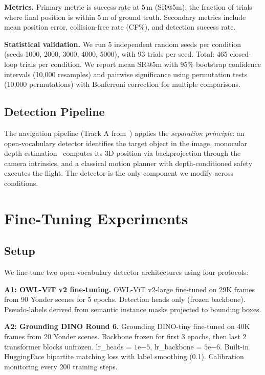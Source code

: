\documentclass[conference]{IEEEtran}
\begin{document}
\textbf{Metrics.} Primary metric is success rate at 5\,m (SR@5m): the fraction of trials where final position is within 5\,m of ground truth. Secondary metrics include mean position error, collision-free rate (CF\%), and detection success rate.

\textbf{Statistical validation.} We run 5 independent random seeds per condition (seeds 1000, 2000, 3000, 4000, 5000), with 93 trials per seed. Total: 465 closed-loop trials per condition. We report mean SR@5m with 95\% bootstrap confidence intervals (10,000 resamples) and pairwise significance using permutation tests (10,000 permutations) with Bonferroni correction for multiple comparisons.

\subsection{Detection Pipeline}

The navigation pipeline (Track A from~\cite{anon2026closing}) applies the \textit{separation principle}: an open-vocabulary detector identifies the target object in the image, monocular depth estimation~\cite{yang2024depth} computes its 3D position via backprojection through the camera intrinsics, and a classical motion planner with depth-conditioned safety executes the flight. The detector is the only component we modify across conditions.

\section{Fine-Tuning Experiments}

\subsection{Setup}

We fine-tune two open-vocabulary detector architectures using four protocols:

\textbf{A1: OWL-ViT v2 fine-tuning.} OWL-ViT v2-large fine-tuned on 29K frames from 90 Yonder scenes for 5 epochs. Detection heads only (frozen backbone). Pseudo-labels derived from semantic instance masks projected to bounding boxes.

\textbf{A2: Grounding DINO Round 6.} Grounding DINO-tiny fine-tuned on 40K frames from 20 Yonder scenes. Backbone frozen for first 3 epochs, then last 2 transformer blocks unfrozen. lr\_heads = $1\mathrm{e}{-5}$, lr\_backbone = $5\mathrm{e}{-6}$. Built-in HuggingFace bipartite matching loss with label smoothing (0.1). Calibration monitoring every 200 training steps.
\end{document}
